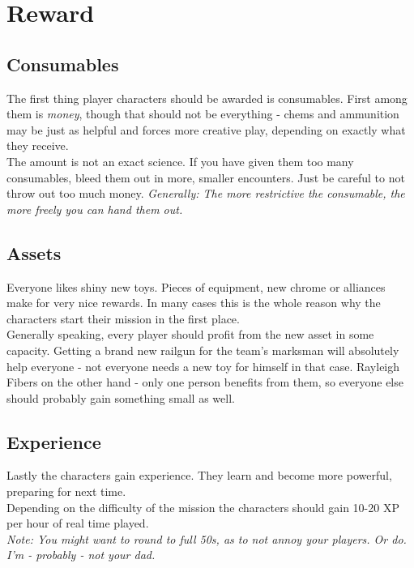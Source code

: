 \section{Reward}
\subsection{Consumables}
The first thing player characters should be awarded is consumables. First among them is \emph{money}, though that should not be everything - chems and ammunition may be just as helpful and forces more creative play, depending on exactly what they receive.\\
The amount is not an exact science. If you have given them too many consumables, bleed them out in more, smaller encounters. Just be careful to not throw out too much money.
\textit{Generally: The more restrictive the consumable, the more freely you can hand them out.}
\subsection{Assets}
Everyone likes shiny new toys. Pieces of equipment, new chrome or alliances make for very nice rewards. In many cases this is the whole reason why the characters start their mission in the first place.\\
Generally speaking, every player should profit from the new asset in some capacity. Getting a brand new railgun for the team's marksman will absolutely help everyone - not everyone needs a new toy for himself in that case. Rayleigh Fibers on the other hand - only one person benefits from them, so everyone else should probably gain something small as well.
\subsection{Experience}
Lastly the characters gain experience. They learn and become more powerful, preparing for next time.\\
Depending on the difficulty of the mission the characters should gain 10-20 XP per hour of real time played.\\
\textit{Note: You might want to round to full 50s, as to not annoy your players. Or do. I'm - probably - not your dad.}
